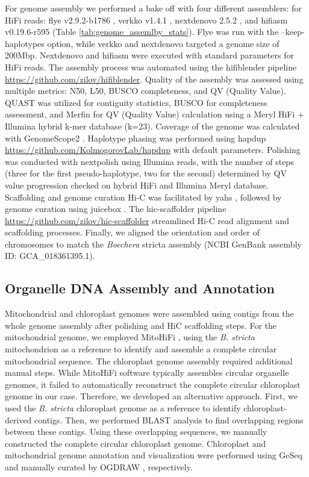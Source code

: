 \documentclass[9pt,twocolumn,twoside,lineno]{gsag3jnl}
\begin{document}
For genome assembly we performed a bake off with four different assemblers: for HiFi reads: flye v2.9.2-b1786 \citep{kolmogorov2019}, verkko v1.4.1 \citep{rautiainen2023}, nextdenovo 2.5.2 \citep{hu2024nextdenovo}, and hifiasm v0.19.6-r595 \citep{cheng2021} (Table \ref{tab:genome_assemlby_stats}). Flye was run with the --keep-haplotypes option, while verkko and nextdenovo targeted a genome size of 200Mbp. Nextdenovo and hifiasm were executed with standard parameters for HiFi reads. The assembly process was automated using the hifiblender pipeline \url{https://github.com/zilov/hifiblender}.
Quality of the assembly was assessed using multiple metrics: N50, L50, BUSCO completeness, and QV (Quality Value). QUAST \citep{gurevich2013} was utilized for contiguity statistics, BUSCO \citep{seppey2019busco} for completeness assessment, and Merfin \citep{formenti2022} for QV (Quality Value) calculation using a Meryl HiFi + Illumina hybrid k-mer database (k=23). Coverage of the genome was calculated with GenomeScope2 \cite{ranallo2020genomescope}. 
Haplotype phasing was performed using hapdup \url{https://github.com/KolmogorovLab/hapdup} with default parameters. Polishing was conducted with nextpolish \citep{hu2020} using Illumina reads, with the number of steps (three for the first pseudo-haplotype, two for the second) determined by QV value progression checked on hybrid HiFi and Illumina Meryl database.
Scaffolding and genome curation Hi-C was facilitated by yahs \citep{zhou2023yahs}, followed by genome curation using juicebox \citep{durand2016juicebox}. The hic-scaffolder pipeline \url{https://github.com/zilov/hic-scaffolder} streamlined Hi-C read alignment and scaffolding processes. Finally, we aligned the orientation and order of chromosomes to match the \textit{Boechera} stricta assembly (NCBI GenBank assembly ID: GCA\_018361395.1).

\subsection{Organelle DNA Assembly and Annotation}
Mitochondrial and chloroplast genomes were assembled using contigs from the whole genome assembly after polishing and HiC scaffolding steps. For the mitochondrial genome, we employed MitoHiFi \citep{uliano2023mitohifi}, using the \textit{B. stricta} mitochondrion as a reference to identify and assemble a complete circular mitochondrial sequence.
The chloroplast genome assembly required additional manual steps. While MitoHiFi software typically assembles circular organelle genomes, it failed to automatically reconstruct the complete circular chloroplast genome in our case. Therefore, we developed an alternative approach. First, we used the \textit{B. stricta} chloroplast genome as a reference to identify chloroplast-derived contigs. Then, we performed BLAST analysis to find overlapping regions between these contigs. Using these overlapping sequences, we manually constructed the complete circular chloroplast genome.
Chloroplast and mitochondrial genome annotation and visualization were performed using GeSeq \citep{tillich2017} and manually curated by OGDRAW 
\cite{greiner2019}, respectively.
\end{document}

